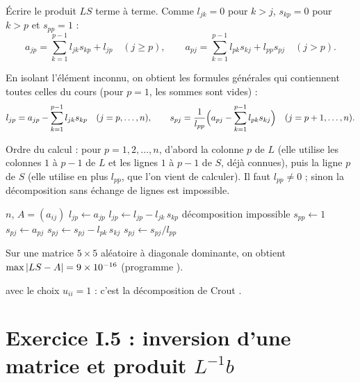 \Etapes
{} Écrire le produit $LS$ terme à terme. Comme $l_{jk} = 0$ pour $k > j$,
$s_{kp} = 0$ pour $k > p$ et $s_{pp} = 1$ :
\[
  a_{jp} = \sum_{k=1}^{p-1} l_{jk}s_{kp} + l_{jp} \quad (j \ge p), \qquad
  a_{pj} = \sum_{k=1}^{p-1} l_{pk}s_{kj} + l_{pp}s_{pj} \quad (j > p).
\]

 En isolant l'élément inconnu, on obtient les formules générales qui
contiennent toutes celles du cours (pour $p = 1$, les sommes sont vides) :
\[
  l_{jp} = a_{jp} - \sum_{k=1}^{p-1} l_{jk}s_{kp} \quad (j = p, \dots, n), \qquad
  s_{pj} = \frac{1}{l_{pp}}\Bigl(a_{pj} - \sum_{k=1}^{p-1} l_{pk}s_{kj}\Bigr)
  \quad (j = p+1, \dots, n).
\]

 Ordre du calcul : pour $p = 1, 2, \dots, n$, d'abord la colonne $p$ de
$L$ (elle utilise les colonnes $1$ à $p-1$ de $L$ et les lignes $1$ à $p-1$ de
$S$, déjà connues), puis la ligne $p$ de $S$ (elle utilise en plus $l_{pp}$, que
l'on vient de calculer). Il faut $l_{pp} \neq 0$ ; sinon la décomposition sans
échange de lignes est impossible.

\begin{algo}[ : décomposition $A = LS$ (Crout)]
  \Require $n$, $A = (a_{ij})$
     
      \State $l_{jp} \leftarrow a_{jp}$
        \State $l_{jp} \leftarrow l_{jp} - l_{jk}\,s_{kp}$
      \EndFor
    \EndFor
     \Print \og décomposition impossible \fg{} \Stop \EndIf
    \State $s_{pp} \leftarrow 1$
     
      \State $s_{pj} \leftarrow a_{pj}$
        \State $s_{pj} \leftarrow s_{pj} - l_{pk}\,s_{kj}$
      \EndFor
      \State $s_{pj} \leftarrow s_{pj}/l_{pp}$
    \EndFor
  \EndFor
\end{algo}

\Verif Sur une matrice $5\times 5$ aléatoire à diagonale dominante, on
obtient $\max\left|LS - A\right| = 9\times 10^{-16}$ (programme
).

\Refs {} avec le choix $u_{ii} = 1$ : c'est la
décomposition de Crout .

\section{\texorpdfstring{Exercice I.5 : inversion d'une matrice et produit $L^{-1}b$}{Exercice I.5 : inversion d'une matrice et produit L\textasciicircum -1 b}}

